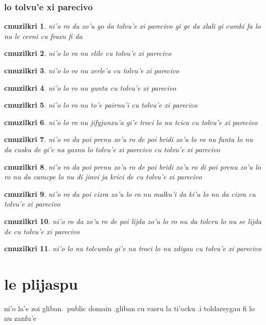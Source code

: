 \documentclass{report}
\newtheorem{cmuzilkri}{cmuzilkri}
\begin{document}
\subsection{lo tolvu'e xi parecivo}
\begin{cmuzilkri}
	ni'o ro da zo'u go da tolvu'e xi parecivo gi ge da xlali gi cumki fa lo nu le cevni cu fraxu fi da
\end{cmuzilkri}
\begin{cmuzilkri}
	ni'o lo ro nu vlile cu tolvu'e xi parecivo
\end{cmuzilkri}
\begin{cmuzilkri}
	ni'o lo ro nu zerle'a cu tolvu'e xi parecivo
\end{cmuzilkri}
\begin{cmuzilkri}
	ni'o lo ro nu gunta cu tolvu'e xi parecivo
\end{cmuzilkri}
\begin{cmuzilkri}
	ni'o lo ro nu to'e pairnu'i cu tolvu'e xi parecivo
\end{cmuzilkri}
\begin{cmuzilkri}
	ni'o lo ro nu jifyjunxu'a gi'e troci lo nu tcica cu tolvu'e xi parecivo
\end{cmuzilkri}
\begin{cmuzilkri}
	ni'o ro da poi prenu zo'u ro de poi bridi zo'u lo ro nu fanta lo nu da cusku de gi'e na gasnu lo tolvu'e xi parecivo cu tolvu'e xi parecivo
\end{cmuzilkri}
\begin{cmuzilkri}
	ni'o ro da poi prenu zo'u ro de poi bridi zo'u ro di poi prenu zo'u lo ro nu da camcpe lo nu di jinvi ja krici de cu tolvu'e xi parecivo
\end{cmuzilkri}
\begin{cmuzilkri}
	ni'o ro da poi cizra zo'u lo ro nu malku'i da ki'u lo nu da cizra cu tolvu'e xi parecivo
\end{cmuzilkri}
\begin{cmuzilkri}
	ni'o ro da zo'u ro de poi lijda zo'u lo ro nu da tolcru lo nu se lijda de cu tolvu'e xi parecivo
\end{cmuzilkri}
\begin{cmuzilkri}
	ni'o lo nu tolcumla gi'e na troci lo nu zdigau cu tolvu'e xi parecivo
\end{cmuzilkri}

\chapter{le plijaspu}
ni'o la'e zoi gliban.\ public domain .gliban cu vasru la ti'ocku  .i toldarsygau fi lo nu zanfu'e
\end{document}
